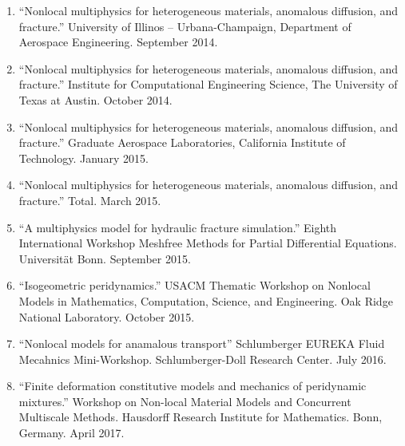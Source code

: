 \begin{enumerate}[resume]
    \item ``Nonlocal multiphysics for heterogeneous materials, anomalous diffusion, and fracture.'' University of Illinos -- Urbana-Champaign, Department of Aerospace Engineering. September 2014.
    \item ``Nonlocal multiphysics for heterogeneous materials, anomalous diffusion, and fracture.'' Institute for Computational Engineering Science, The University of Texas at Austin. October 2014.
    \item ``Nonlocal multiphysics for heterogeneous materials, anomalous diffusion, and fracture.'' Graduate Aerospace Laboratories, California Institute of Technology. January 2015.
    \item ``Nonlocal multiphysics for heterogeneous materials, anomalous diffusion, and fracture.'' Total. March 2015.
    \item ``A multiphysics model for hydraulic fracture simulation.''  Eighth International Workshop Meshfree Methods for Partial Differential Equations. Universit\"{a}t Bonn. September 2015.
    \item ``Isogeometric peridynamics.'' USACM Thematic Workshop on Nonlocal Models in Mathematics, Computation, Science, and Engineering.  Oak Ridge National Laboratory. October 2015.
    \item ``Nonlocal models for anamalous transport'' Schlumberger EUREKA Fluid Mecahnics Mini-Workshop. Schlumberger-Doll Research Center. July 2016.
    \item ``Finite deformation constitutive models and mechanics of peridynamic mixtures.'' Workshop on Non-local Material Models and Concurrent Multiscale Methods. Hausdorff Research Institute for Mathematics.  Bonn, Germany.  April 2017.
\end{enumerate}
